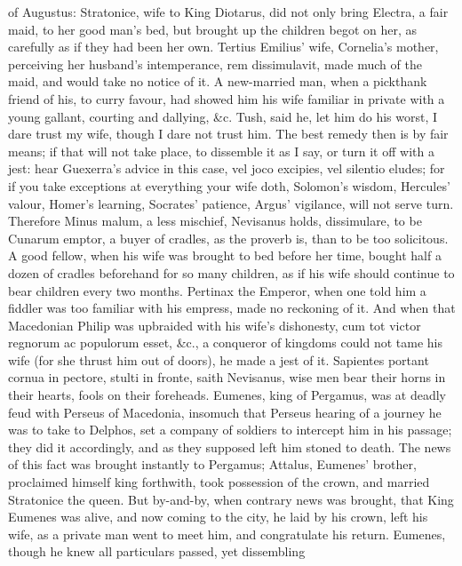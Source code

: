 {of Augustus: Stratonice, wife to King Diotarus, did not only bring
Electra, a fair maid, to her good man's bed, but brought up the
children begot on her, as carefully as if they had been her own.
Tertius Emilius' wife, Cornelia's mother, perceiving her husband's
intemperance, rem dissimulavit, made much of the maid, and would take
no notice of it. A new-married man, when a pickthank friend of his, to
curry favour, had showed him his wife familiar in private with a young
gallant, courting and dallying, \&c. Tush, said he, let him do his
worst, I dare trust my wife, though I dare not trust him. The best
remedy then is by fair means; if that will not take place, to dissemble
it as I say, or turn it off with a jest: hear Guexerra's advice in this
case, vel joco excipies, vel silentio eludes; for if you take
exceptions at everything your wife doth, Solomon's wisdom, Hercules'
valour, Homer's learning, Socrates' patience, Argus' vigilance, will
not serve turn. Therefore Minus malum, a less mischief, Nevisanus
holds, dissimulare, to be Cunarum emptor, a buyer of cradles, as
the proverb is, than to be too solicitous. A good fellow, when
his wife was brought to bed before her time, bought half a dozen of
cradles beforehand for so many children, as if his wife should continue
to bear children every two months. Pertinax the Emperor, when one
told him a fiddler was too familiar with his empress, made no reckoning
of it. And when that Macedonian Philip was upbraided with his wife's
dishonesty, cum tot victor regnorum ac populorum esset, \&c., a
conqueror of kingdoms could not tame his wife (for she thrust him out
of doors), he made a jest of it. Sapientes portant cornua in pectore,
stulti in fronte, saith Nevisanus, wise men bear their horns in their
hearts, fools on their foreheads. Eumenes, king of Pergamus, was at
deadly feud with Perseus of Macedonia, insomuch that Perseus hearing of
a journey he was to take to Delphos, set a company of soldiers to
intercept him in his passage; they did it accordingly, and as they
supposed left him stoned to death. The news of this fact was brought
instantly to Pergamus; Attalus, Eumenes' brother, proclaimed himself
king forthwith, took possession of the crown, and married Stratonice
the queen. But by-and-by, when contrary news was brought, that King
Eumenes was alive, and now coming to the city, he laid by his crown,
left his wife, as a private man went to meet him, and congratulate his
return. Eumenes, though he knew all particulars passed, yet dissembling
}
